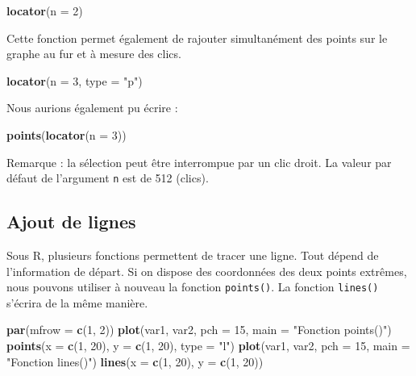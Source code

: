 \documentclass[]{article}
\newenvironment{Shaded}{\begin{snugshade}}{\end{snugshade}}
\newcommand{\DataTypeTok}[1]{\textcolor[rgb]{0.13,0.29,0.53}{#1}}
\newcommand{\DecValTok}[1]{\textcolor[rgb]{0.00,0.00,0.81}{#1}}
\newcommand{\KeywordTok}[1]{\textcolor[rgb]{0.13,0.29,0.53}{\textbf{#1}}}
\newcommand{\NormalTok}[1]{#1}
\newcommand{\StringTok}[1]{\textcolor[rgb]{0.31,0.60,0.02}{#1}}
\begin{document}
\begin{Shaded}
\begin{Highlighting}[]
\KeywordTok{locator}\NormalTok{(}\DataTypeTok{n =} \DecValTok{2}\NormalTok{)}
\end{Highlighting}
\end{Shaded}

Cette fonction permet également de rajouter simultanément des points sur le graphe au fur et à mesure des clics.

\begin{Shaded}
\begin{Highlighting}[]
\KeywordTok{locator}\NormalTok{(}\DataTypeTok{n =} \DecValTok{3}\NormalTok{, }\DataTypeTok{type =} \StringTok{"p"}\NormalTok{)}
\end{Highlighting}
\end{Shaded}

Nous aurions également pu écrire :

\begin{Shaded}
\begin{Highlighting}[]
\KeywordTok{points}\NormalTok{(}\KeywordTok{locator}\NormalTok{(}\DataTypeTok{n =} \DecValTok{3}\NormalTok{))}
\end{Highlighting}
\end{Shaded}

Remarque : la sélection peut être interrompue par un clic droit. La valeur par défaut de l'argument \texttt{n} est de 512 (clics).

\hypertarget{ajout-de-lignes}{%
\subsection{Ajout de lignes}\label{ajout-de-lignes}}

Sous R, plusieurs fonctions permettent de tracer une ligne. Tout dépend de l'information de départ. Si on dispose des coordonnées des deux points extrêmes, nous pouvons utiliser à nouveau la fonction \texttt{points()}. La fonction \texttt{lines()} s'écrira de la même manière.

\begin{Shaded}
\begin{Highlighting}[]
\KeywordTok{par}\NormalTok{(}\DataTypeTok{mfrow =} \KeywordTok{c}\NormalTok{(}\DecValTok{1}\NormalTok{, }\DecValTok{2}\NormalTok{))}
\KeywordTok{plot}\NormalTok{(var1, var2, }\DataTypeTok{pch =} \DecValTok{15}\NormalTok{, }\DataTypeTok{main =} \StringTok{"Fonction points()"}\NormalTok{)}
\KeywordTok{points}\NormalTok{(}\DataTypeTok{x =} \KeywordTok{c}\NormalTok{(}\DecValTok{1}\NormalTok{, }\DecValTok{20}\NormalTok{), }\DataTypeTok{y =} \KeywordTok{c}\NormalTok{(}\DecValTok{1}\NormalTok{, }\DecValTok{20}\NormalTok{), }\DataTypeTok{type =} \StringTok{"l"}\NormalTok{)}
\KeywordTok{plot}\NormalTok{(var1, var2, }\DataTypeTok{pch =} \DecValTok{15}\NormalTok{, }\DataTypeTok{main =} \StringTok{"Fonction lines()"}\NormalTok{)}
\KeywordTok{lines}\NormalTok{(}\DataTypeTok{x =} \KeywordTok{c}\NormalTok{(}\DecValTok{1}\NormalTok{, }\DecValTok{20}\NormalTok{), }\DataTypeTok{y =} \KeywordTok{c}\NormalTok{(}\DecValTok{1}\NormalTok{, }\DecValTok{20}\NormalTok{))}
\end{Highlighting}
\end{Shaded}
\end{document}
